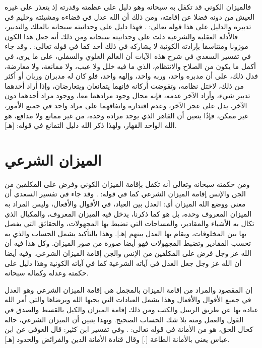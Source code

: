 فالميزان الكوني قد تكفل به سبحانه وهو دليل على عظمته وقدرته إذ يتعذر على غيره العيش من دونه فضلا عن إقامته، ومن ذلك أن الله عدل في قضاءه ومشيئته وحليم في تدبيره والدليل على هذا قوله تعالى:
\quranayah*[35][41]{\footnotesize \surahname*[35]}. فهذا دليل على وحدانيته سبحانه بالملك والتدبير، فالأدلة العقلية والشرعية دلت على وحدانيته سبحانه ومن ذلك أنه جعل هذا الكون موزونا ومتناسقا بإرادته الكونية لا يشاركه في ذلك أحد كما في قوله تعالى:
\quranayah*[21][22]{\footnotesize \surahname*[21]}. وقد جاء في تفسير السعدي في شرح هذه الآيات أن العالم العلوي والسفلي، على ما يرى، في أكمل ما يكون من الصلاح والانتظام، الذي ما فيه خلل ولا عيب، ولا ممانعة، ولا معارضة، فدل ذلك، على أن مدبره واحد، وربه واحد، وإلهه واحد، فلو كان له مدبران وربان أو أكثر من ذلك، لاختل نظامه، وتقوضت أركانه فإنهما يتمانعان ويتعارضان، وإذا أراد أحدهما تدبير شيء، وأراد الآخر عدمه، فإنه محال وجود مرادهما معا، ووجود مراد أحدهما دون الآخر، يدل على عجز الآخر، وعدم اقتداره واتفاقهما على مراد واحد في جميع الأمور، غير ممكن، فإذًا يتعين أن القاهر الذي يوجد مراده وحده، من غير ممانع ولا مدافع، هو الله الواحد القهار، ولهذا ذكر الله دليل التمانع في قوله:
\quranayah*[23][91]{\footnotesize \surahname*[23]} [هـ].

\section{الميزان الشرعي}

ومن حكمته سبحانه وتعالى أنه تكفل بإقامة الميزان الكوني وفرض على المكلفين من الجن والإنس إقامة الميزان الشرعي كما في قوله:
\quranayah*[55][7-9]{\footnotesize \surahname*[55]}. وقد جاء في تفسير السعدي أن معنى ووضع الله الميزان أي: العدل بين العباد، في الأقوال والأفعال، وليس المراد به الميزان المعروف وحده، بل هو كما ذكرنا، يدخل فيه الميزان المعروف، والمكيال الذي تكال به الأشياء والمقادير، والمساحات التي تضبط بها المجهولات، والحقائق التي يفصل بها بين المخلوقات، ويقام بها العدل بينهم [هـ]. وهذا بالتأكيد يشمل الحساب والذي به تحسب المقادير وتضبط المجهولات فهو أيضا صورة من صور الميزان. وكل هذا فيه أن الله عز وجل فرض على المكلفين من الإنس والجن إقامة الميزان الشرعي. وفيه أيضا أن الله عز وجل جعل العدل في آياته الشرعية كما في آياته الكونية وهذا دليل على حكمته وعدله وكماله سبحانه.

إن المقصود والمراد من إقامة الميزان بالمجمل هي إقامة الميزان الشرعي وهو العدل في جميع الأقوال والأفعال وهذا يشمل العبادات التي يحبها الله ويرضاها والتي أمر الله عباده بها عن طريق الرسل والكتب ومن ذلك إقامة الميزان والكيل بالقسط والصدق في القول والعمل ومنه بلا شك الحساب الصحيح. وبهذا يتبين أن الميزان الشرعي، حاله كحال الحق، هو من الأمانة في قوله تعالى:
\quranayah*[33][72]{\footnotesize \surahname*[33]}. وفي تفسير ابن كثير: قال العوفي عن ابن عباس يعني بالأمانة الطاعة [.] وقال قتادة الأمانة الدين والفرائض والحدود [هـ].

